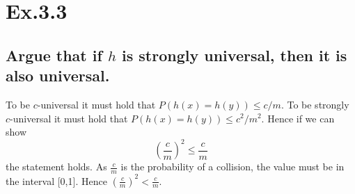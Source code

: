 \section*{Ex.3.3}
\subsection*{Argue that if $h$ is strongly universal, then it is also universal.}

To be $c$-universal it must hold that $P(h(x) = h(y))\leq c/m$. To be strongly $c$-universal it must hold that $P(h(x) = h(y))\leq c^2/m^2$. Hence if we can show 
$$\left(\frac{c}{m}\right)^2\leq\frac{c}{m}$$ 
the statement holds. As $\frac{c}{m}$ is the probability of a collision, the value must be in the interval [0,1]. Hence $\left(\frac{c}{m}\right)^2 < \frac{c}{m}$.